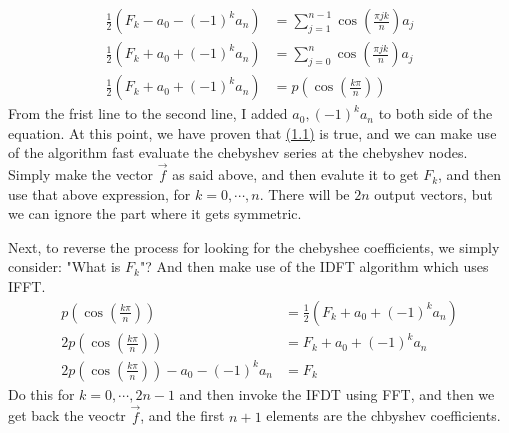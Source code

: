\documentclass[]{article}
\begin{document}
    \begin{align*}\tag{1.5}\label{eqn:1.5}
        \frac{1}{2}
        \left(
            F_k - a_0 - (-1)^ka_n
        \right) &= 
        \sum_{j = 1}^{n - 1}
        \cos \left(
            \frac{\pi j k}{n}
        \right)a_j
        \\
        \frac{1}{2}
        \left(
            F_k + a_0 + (-1)^ka_n
        \right) &= 
        \sum_{j = 0}^{n}
        \cos \left(
            \frac{\pi j k}{n}
        \right)a_j
        \\
        \frac{1}{2}
        \left(
            F_k + a_0 + (-1)^ka_n
        \right) &= p\left(
            \cos\left(
                \frac{k\pi}{n}
            \right)
        \right)
    \end{align*}
    From the frist line to the second line, I added $a_0, (-1)^ka_n$ to both side of the equation. At this point, we have proven that \hyperref[eqn:1.1]{(1.1)} is true, and we can make use of the algorithm fast evaluate the chebyshev series at the chebyshev nodes. Simply make the vector $\vec{f}$ as said above, and then evalute it to get $F_k$, and then use that above expression, for $k = 0, \cdots, n$. There will be $2n$ output vectors, but we can ignore the part where it gets symmetric. 
    \par
    Next, to reverse the process for looking for the chebyshee coefficients, we simply consider: "What is $F_k$"? And then make use of the IDFT algorithm which uses IFFT. 
    \begin{align*}\tag{1.6}\label{eqn:1.6}
        p\left(
            \cos\left(
                \frac{k\pi}{n}
            \right)
        \right) &= 
        \frac{1}{2}
        \left(
            F_k + a_0 + (-1)^ka_n
        \right)
        \\
        2 p\left(
            \cos \left(
                \frac{k\pi }{n}
            \right)
        \right)  
        &= F_k + a_0 + (-1)^ka_n
        \\
        2 p\left(
            \cos \left(
                \frac{k\pi }{n}
            \right)
        \right) - a_0 - (-1)^ka_n
        &= F_k
    \end{align*}
    Do this for $k = 0, \cdots, 2n - 1$ and then invoke the IFDT using FFT, and then we get back the veoctr $\vec{f}$, and the first $n + 1$ elements are the chbyshev coefficients. 
\end{document}
